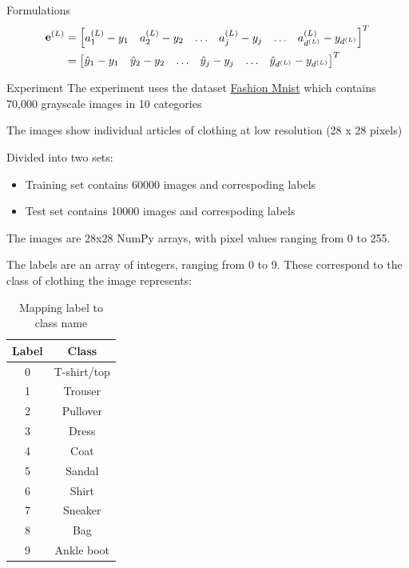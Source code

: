 \documentclass[10pt]{beamer}
\theoremstyle{remark}
\theoremstyle{definition}
\begin{document}
\begin{frame}[allowframebreaks]{Formulations}
	\begin{equation}
		\begin{aligned}
			\bold{e}^{(L)}&=\begin{bmatrix} a_1^{(L)} - y_1 & a_2^{(L)} - y_2 & \dots & a_j^{(L)} - y_j & \dots & a_{d^{(L)}}^{(L)} - y_{d^{(L)}} \end{bmatrix}^T\\&=\begin{bmatrix} \hat{y}_1 - y_1 & \hat{y}_2 - y_2 & \dots & \hat{y}_j - y_j & \dots & \hat{y}_{d^{(L)}} - y_{d^{(L)}} \end{bmatrix}^T
		\end{aligned}
	\end{equation}

\end{frame}

\begin{frame}[allowframebreaks]{Experiment}
	The experiment uses the dataset \href{https://github.com/zalandoresearch/fashion-mnist}{Fashion Mnist} which contains 70,000 grayscale images in 10 categories

	The images show individual articles of clothing at low resolution (28 x 28 pixels)

	Divided into two sets:
	\begin{itemize}
		\item Training set contains 60000 images and correspoding labels
  		\item Test set contains 10000 images and correspoding labels
	\end{itemize}

	The images are 28x28 NumPy arrays, with pixel values ranging from 0 to 255. 
	
	The labels are an array of integers, ranging from 0 to 9. These correspond to the class of clothing the image represents:

	\begin{table} [h!]
		\centering
		\begin{tabular}{ || c | c  || }
		\hline
		Label & Class \\ [0.5 ex]
		\hline \hline
		0 & T-shirt/top \\ \hline
		1 & Trouser \\ \hline
		2 & Pullover \\ \hline
		3 & Dress \\ \hline
		4 & Coat \\ \hline
		5 & Sandal\\ \hline
		6 & Shirt\\ \hline 
		7 & Sneaker \\ \hline
		8 & Bag \\ \hline
		9 & Ankle boot \\ [1ex]
		\hline
		\end{tabular}
		\caption{Mapping label to class name}
	\end{table}


\end{frame}
\end{document}
